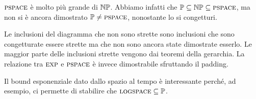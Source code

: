 $\textsc{pspace}$ è molto più grande di $\mathbb{NP}$. Abbiamo infatti che $\mathbb{P} \subseteq \mathbb{NP}
\subseteq \textsc{pspace}$, ma non si è ancora dimostrato $\mathbb{P} \not= \textsc{pspace}$, nonostante lo si
congetturi.

Le inclusioni del diagramma che non sono strette sono inclusioni che sono congetturate essere
strette ma che non sono ancora state dimostrate esserlo. Le maggior parte delle inclusioni strette
vengono dai teoremi della gerarchia. La relazione tra $\textsc{exp}$ e $\textsc{pspace}$ è invece dimostrabile
sfruttando il padding.

Il bound esponenziale dato dallo spazio al tempo è interessante perché, ad esempio, ci permette di
stabilire che $\textsc{logspace} \subseteq \mathbb{P}$.

